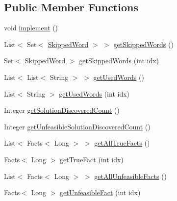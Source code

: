 \subsection*{Public Member Functions}
\begin{DoxyCompactItemize}
\item 
void \hyperlink{classit_1_1emarolab_1_1cagg_1_1core_1_1evaluation_1_1inputFormatting_1_1ThreadedInputFormatter_1_1FactsSearcher_adf7de4f3a0a7ae5250dc732240406d08}{implement} ()
\item 
List$<$ Set$<$ \hyperlink{classit_1_1emarolab_1_1cagg_1_1core_1_1evaluation_1_1inputFormatting_1_1ThreadedInputFormatter_1_1SkippedWord}{Skipped\-Word} $>$ $>$ \hyperlink{classit_1_1emarolab_1_1cagg_1_1core_1_1evaluation_1_1inputFormatting_1_1ThreadedInputFormatter_1_1FactsSearcher_a2ff19db5a0ab6f3f819bc19f1cd8e395}{get\-Skipped\-Words} ()
\item 
Set$<$ \hyperlink{classit_1_1emarolab_1_1cagg_1_1core_1_1evaluation_1_1inputFormatting_1_1ThreadedInputFormatter_1_1SkippedWord}{Skipped\-Word} $>$ \hyperlink{classit_1_1emarolab_1_1cagg_1_1core_1_1evaluation_1_1inputFormatting_1_1ThreadedInputFormatter_1_1FactsSearcher_a2f4dca14c4fa47acbd602881bebb6a86}{get\-Skipped\-Words} (int idx)
\item 
List$<$ List$<$ String $>$ $>$ \hyperlink{classit_1_1emarolab_1_1cagg_1_1core_1_1evaluation_1_1inputFormatting_1_1ThreadedInputFormatter_1_1FactsSearcher_abf77ee62f3841fd52d089b01efeeeb24}{get\-Used\-Words} ()
\item 
List$<$ String $>$ \hyperlink{classit_1_1emarolab_1_1cagg_1_1core_1_1evaluation_1_1inputFormatting_1_1ThreadedInputFormatter_1_1FactsSearcher_a6a37045ad9a624db0a749ab77e946575}{get\-Used\-Words} (int idx)
\item 
Integer \hyperlink{classit_1_1emarolab_1_1cagg_1_1core_1_1evaluation_1_1inputFormatting_1_1ThreadedInputFormatter_1_1FactsSearcher_a3f84f421dbc341866f072af70e401804}{get\-Solution\-Discovered\-Count} ()
\item 
Integer \hyperlink{classit_1_1emarolab_1_1cagg_1_1core_1_1evaluation_1_1inputFormatting_1_1ThreadedInputFormatter_1_1FactsSearcher_a5b4e91561443f881e7954a73d456ff51}{get\-Unfeasible\-Solution\-Discovered\-Count} ()
\item 
List$<$ Facts$<$ Long $>$ $>$ \hyperlink{classit_1_1emarolab_1_1cagg_1_1core_1_1evaluation_1_1inputFormatting_1_1ThreadedInputFormatter_1_1FactsSearcher_ab26cfe061faa75cbdcf25354b25af580}{get\-All\-True\-Facts} ()
\item 
Facts$<$ Long $>$ \hyperlink{classit_1_1emarolab_1_1cagg_1_1core_1_1evaluation_1_1inputFormatting_1_1ThreadedInputFormatter_1_1FactsSearcher_acc82f38c493546a7716fbb34c78f150a}{get\-True\-Fact} (int idx)
\item 
List$<$ Facts$<$ Long $>$ $>$ \hyperlink{classit_1_1emarolab_1_1cagg_1_1core_1_1evaluation_1_1inputFormatting_1_1ThreadedInputFormatter_1_1FactsSearcher_abe9e421d613916f156b91b3a767b0719}{get\-All\-Unfeasible\-Facts} ()
\item 
Facts$<$ Long $>$ \hyperlink{classit_1_1emarolab_1_1cagg_1_1core_1_1evaluation_1_1inputFormatting_1_1ThreadedInputFormatter_1_1FactsSearcher_a346430fe9105431725bad961275bfb70}{get\-Unfeasible\-Fact} (int idx)
\end{DoxyCompactItemize}
